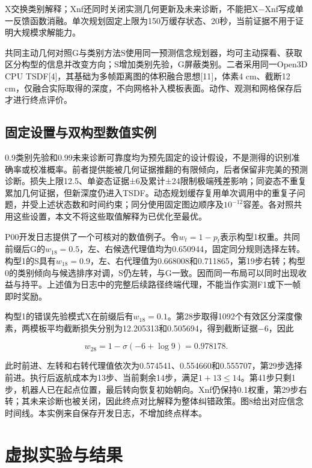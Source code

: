 \documentclass[11pt,a4paper]{article}
\begin{document}
X交换类别解释；Xnf还同时关闭实测几何更新及未来诊断，不能把X−Xnf写成单一反馈函数消融。单次规划固定上限为150万缓存状态、20秒，当前证据不用于证明大规模求解能力。

共同主动几何对照G与类别方法S使用同一预测信念规划器，均可主动探看、获取区分构型的信息并改变方向；S增加类别先验，G屏蔽类别。二者采用同一Open3D CPU TSDF{[}4{]}，其基础为多帧距离图的体积融合思想{[}11{]}，体素4 cm、截断12 cm，仅融合实际取得的深度，不向网格补入模板表面。动作、观测和网格保存后才进行终点评价。

\hypertarget{ux56faux5b9aux8bbeux7f6eux4e0eux53ccux6784ux578bux6570ux503cux5b9eux4f8b}{%
\subsection{固定设置与双构型数值实例}\label{ux56faux5b9aux8bbeux7f6eux4e0eux53ccux6784ux578bux6570ux503cux5b9eux4f8b}}

0.9类别先验和0.99未来诊断可靠度均为预先固定的设计假设，不是测得的识别准确率或校准概率。前者提供能被几何证据推翻的有限倾向，后者保留非完美的预测诊断。损失上限12.5、单姿态证据±6及累计±24限制极端残差影响；同姿态不重复累加几何证据，但新深度仍进入TSDF。动态规划缓存复用单次调用中的重复子问题，并受上述状态数和时间约束；同分使用固定图边顺序及\(10^{-12}\)容差。各对照共用这些设置，本文不将这些取值解释为已优化至最优。

P00开发日志提供了一个可核对的数值例子。令\(w_t=1-p_t\)表示构型1权重。共同前缀后G的\(w_{18}=0.5\)，左、右候选代理值均为0.650944，固定同分规则选择左转。构型1的S具有\(w_{18}=0.9\)，左、右代理值为0.668008和0.711865，第19步右转；构型0的类别倾向与候选排序对调，S仍左转，与G一致。因而同一布局可以同时出现收益与持平。上述值为日志中的完整后续路径终端代理，不能当作实测F1或下一帧即时奖励。

构型1的错误先验模式X在前缀后有\(w_{18}=0.1\)。第28步取得1092个有效区分深度像素，两模板平均截断损失分别为12.205313和0.505694，得到截断证据−6，因此

\[
w_{28}=1-\sigma(-6+\log9)=0.978178.
\]

此时前进、左转和右转代理值依次为0.574541、0.554660和0.555707，第29步选择前进。执行后返航成本为13步、当前剩余14步，满足\(1+13\le14\)。第41步只剩1步，机器人已在起点位置，最后转向恢复初始朝向。Xnf仍保持0.1权重，第29步右转；其未来诊断也被关闭，因此终点对比解释为整体纠错政策。图8给出对应信念时间线。本实例来自保存开发日志，不增加终点样本。

\hypertarget{ux865aux62dfux5b9eux9a8cux4e0eux7ed3ux679c}{%
\section{虚拟实验与结果}\label{ux865aux62dfux5b9eux9a8cux4e0eux7ed3ux679c}}
\end{document}
